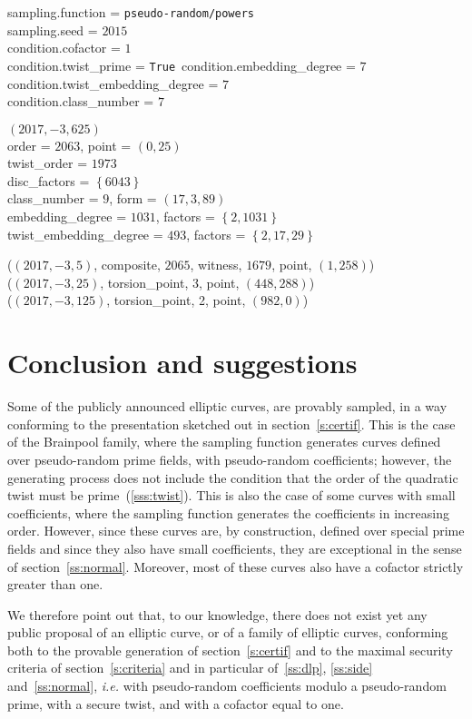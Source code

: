 \documentclass[twocolumn,letterpaper,10pt]{article}
\def\acco#1{\left\{#1\right\}}
\begin{document}
sampling.function = \texttt{pseudo-random/powers}\\
sampling.seed = $2015$\\
condition.cofactor = $1$\\
condition.twist\_prime = \texttt{True}\
condition.embedding\_degree = $7$\\
condition.twist\_embedding\_degree = $7$\\
condition.class\_number = $7$

$(2017, -3, 625)$\\
order = $2063$, point = $(0, 25)$\\
twist\_order = $1973$\\
disc\_factors = $\acco{6043}$\\
class\_number = $9$, form = $(17,3,89)$\\
embedding\_degree = $1031$, factors = $\acco{2, 1031}$\\
twist\_embedding\_degree = $493$, factors = $\acco{2, 17, 29}$

($(2017, -3, 5)$, composite, $2065$, witness, $1679$,
  point, $(1,258)$)\\
($(2017, -3, 25)$, torsion\_point, 3, point, $(448, 288)$)\\
($(2017, -3, 125)$, torsion\_point, 2, point, $(982, 0)$)

\endgroup%

\section*{Conclusion and suggestions}

Some of the publicly announced elliptic curves,
are provably sampled, in a way conforming to the presentation
sketched out in section~\ref{s:certif}.
This is the case of the Brainpool family,
where the sampling function generates
curves defined over pseudo-random prime fields,
with pseudo-random coefficients;
however, the generating process does not include
the condition that the order of the quadratic twist must be
prime~(\ref{sss:twist}).
This is also the case of some curves with small coefficients,
where the sampling function generates the coefficients
in increasing order.
However, since these curves are, by construction,
defined over special prime fields
and since they also have small coefficients,
they are exceptional in the sense of section~\ref{ss:normal}.
Moreover, most of these curves
also have a cofactor strictly greater than one.

We therefore point out that, to our knowledge,
there does not exist yet any public proposal of an elliptic curve,
or of a family of elliptic curves, conforming both
to the provable generation of section~\ref{s:certif}
and to the maximal security criteria of section~\ref{s:criteria}
and in particular of~\ref{ss:dlp}, \ref{ss:side} and~\ref{ss:normal},
\emph{i.e.} with pseudo-random coefficients
modulo a pseudo-random prime,
with a secure twist,
and with a cofactor equal to one.



\end{document}
